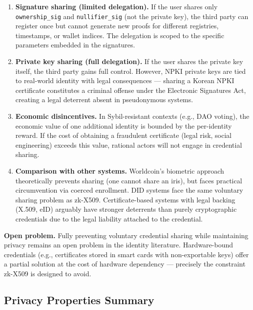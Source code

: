 \documentclass[11pt, a4paper]{article}
\begin{document}
\begin{enumerate}
\def\labelenumi{\arabic{enumi}.}
\item
  \textbf{Signature sharing (limited delegation).} If the user shares
  only \texttt{ownership\_sig} and \texttt{nullifier\_sig} (not the
  private key), the third party can register once but cannot generate
  new proofs for different registries, timestamps, or wallet indices.
  The delegation is scoped to the specific parameters embedded in the
  signatures.
\item
  \textbf{Private key sharing (full delegation).} If the user shares the
  private key itself, the third party gains full control. However, NPKI
  private keys are tied to real-world identity with legal consequences
  --- sharing a Korean NPKI certificate constitutes a criminal offense
  under the Electronic Signatures Act, creating a legal deterrent absent
  in pseudonymous systems.
\item
  \textbf{Economic disincentives.} In Sybil-resistant contexts (e.g.,
  DAO voting), the economic value of one additional identity is bounded
  by the per-identity reward. If the cost of obtaining a fraudulent
  certificate (legal risk, social engineering) exceeds this value,
  rational actors will not engage in credential sharing.
\item
  \textbf{Comparison with other systems.} Worldcoin's biometric approach
  theoretically prevents sharing (one cannot share an iris), but faces
  practical circumvention via coerced enrollment. DID systems face the
  same voluntary sharing problem as zk-X509. Certificate-based systems
  with legal backing (X.509, eID) arguably have stronger deterrents than
  purely cryptographic credentials due to the legal liability attached
  to the credential.
\end{enumerate}

\textbf{Open problem.} Fully preventing voluntary credential sharing
while maintaining privacy remains an open problem in the identity
literature. Hardware-bound credentials (e.g., certificates stored in
smart cards with non-exportable keys) offer a partial solution at the
cost of hardware dependency --- precisely the constraint zk-X509 is
designed to avoid.

\subsection{Privacy Properties
Summary}\label{privacy-properties-summary}
\end{document}
